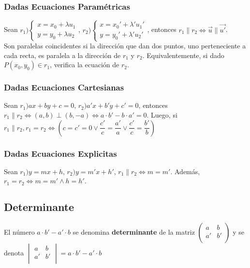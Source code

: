 \documentclass[11pt,a4paper]{article}
\begin{document}
\subsubsection{Dadas Ecuaciones Param\'etricas}
Sean $r_1)\left\{\begin{array}{l}x=x_0+\lambda u_1\\y=y_0+\lambda u_2\end{array}\right.$, $r_2)\left\{\begin{array}{l}x=x_0'+\lambda' u_1'\\y=y_0'+\lambda' u_2'\end{array}\right.$, entonces $r_1 \parallel r_2 \iff \overrightarrow{u} \parallel \overrightarrow{u'}$.\\

\noindent Son paralelas coincidentes si la direcci\'on que dan dos puntos, uno perteneciente a cada recta, es paralela a la direcci\'on de $r_1$ y $r_2$. Equivalentemente, si dado $P(x_0,y_0)\in r_1$, verifica la ecuaci\'on de $r_2$.
\subsubsection{Dadas Ecuaciones Cartesianas}
Sean $r_1) ax+by+c=0$, $r_2)a'x+b'y+c'=0$, entonces $r_1 \parallel r_2 \iff (a,b)\perp(b,-a) \iff a\cdot b' - b\cdot a' = 0$. Luego, si $r_1 \parallel r_2, r_1=r_2 \iff \left(c=c'=0 \lor \dfrac{c'}{c}=\dfrac{a'}{a} \lor \dfrac{c'}{c}=\dfrac{b'}{b}\right)$

\subsubsection{Dadas Ecuaciones Explicitas}
Sean $r_1)y=mx+h$, $r_2)y=m'x+h'$, $r_1 \parallel r_2 \iff m=m'$. Adem\'as, $r_1=r_2\iff m=m' \land h=h'$.

\subsection{Determinante}
El n\'umero $a \cdot b' - a' \cdot b$ se denomina \textbf{determinante} de la matriz $\begin{pmatrix}a&b\\a'&b'\\\end{pmatrix}$ y se denota $\begin{vmatrix}a&b\\a'&b'\\\end{vmatrix} = a \cdot b' - a' \cdot b$
\end{document}
